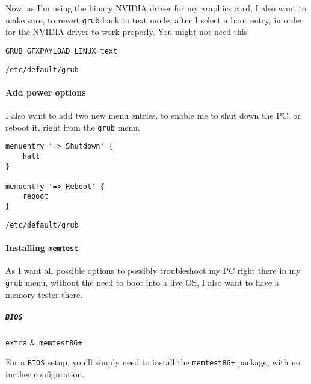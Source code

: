\documentclass[10pt]{dustdoc}
\begin{document}
Now, as I’m using the binary NVIDIA driver for my graphics card, I also want to make sure, to revert \texttt{grub} back to text mode, after I select a boot entry, in order for the NVIDIA driver to work properly.
You might not need this

\begin{mintedlisting}
    \begin{verbatim}
GRUB_GFXPAYLOAD_LINUX=text
    \end{verbatim}

    \caption{\texttt{/etc/default/grub}}
\end{mintedlisting}

\paragraph{Add power options}
\label{par:add-power-options}

I also want to add two new menu entries, to enable me to shut down the PC, or reboot it, right from the \texttt{grub} menu.

\begin{mintedlisting}
    \begin{verbatim}
menuentry '=> Shutdown' {
    halt
}

menuentry '=> Reboot' {
    reboot
}
    \end{verbatim}

    \caption{\texttt{/etc/default/grub}}
\end{mintedlisting}

\paragraph{Installing \texttt{memtest}}
\label{par:installing-memtest}

As I want all possible options to possibly troubleshoot my PC right there in my \texttt{grub} menu,  without the need to boot into a live OS, I also want to have a memory tester there.

\subparagraph{\texttt{BIOS}}
\label{par:installing-memtest-bios}

\begin{packagetable}
    \texttt{extra} & \texttt{memtest86+} \\
\end{packagetable}

For a \texttt{BIOS} setup, you’ll simply need to install the \texttt{memtest86+} package, with no further configuration.
\end{document}
